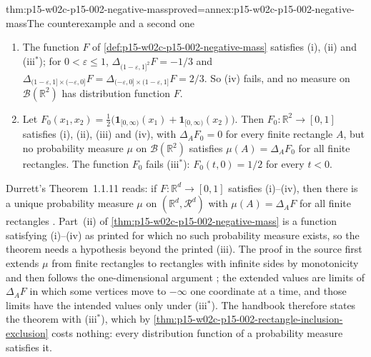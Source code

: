 \begin{hblemma}{thm:p15-w02c-p15-002-negative-mass}{proved=annex:p15-w02c-p15-002-negative-mass}{The counterexample and a second one}
\begin{enumerate}
\item The function \(F\) of \cref{def:p15-w02c-p15-002-negative-mass}
      satisfies (i), (ii) and (iii\(^*\)); for \(0<\varepsilon\leq1\),
      \(\Delta_{(1-\varepsilon,1]^2}F=-1/3\) and
      \(\Delta_{(1-\varepsilon,1]\times(-\varepsilon,0]}F
       =\Delta_{(-\varepsilon,0]\times(1-\varepsilon,1]}F=2/3\). So
      (iv) fails, and no measure on \(\mathcal B(\mathbb R^2)\) has
      distribution function \(F\).
\item Let
      \(F_0(x_1,x_2)=\tfrac12\bigl(\mathbf1_{[0,\infty)}(x_1)
                     +\mathbf1_{[0,\infty)}(x_2)\bigr)\).
      Then \(F_0:\mathbb R^2\to[0,1]\) satisfies (i), (ii), (iii) and
      (iv), with \(\Delta_AF_0=0\) for every finite rectangle \(A\), but no
      probability measure \(\mu\) on \(\mathcal B(\mathbb R^2)\) satisfies
      \(\mu(A)=\Delta_AF_0\) for all finite rectangles. The function
      \(F_0\) fails (iii\(^*\)): \(F_0(t,0)=1/2\) for every \(t<0\).
\end{enumerate}
\end{hblemma}

Durrett's Theorem~1.1.11 reads: if \(F:\mathbb R^d\to[0,1]\) satisfies
(i)--(iv), then there is a unique probability measure \(\mu\) on
\((\mathbb R^d,\mathcal R^d)\) with \(\mu(A)=\Delta_AF\) for all finite
rectangles \cite[Theorem~1.1.11, p.~7]{DurrettPTEAuthor2019}. Part~(ii) of
\cref{thm:p15-w02c-p15-002-negative-mass} is a function satisfying
(i)--(iv) as printed for which no such probability measure exists, so the
theorem needs a hypothesis beyond the printed (iii). The proof in the
source first extends \(\mu\) from finite rectangles to rectangles with
infinite sides by monotonicity and then follows the one-dimensional
argument \cite[pp.~8--9]{DurrettPTEAuthor2019}; the extended values are
limits of \(\Delta_AF\) in which some vertices move to \(-\infty\) one
coordinate at a time, and those limits have the intended values only under
(iii\(^*\)). The handbook therefore states the theorem with (iii\(^*\)),
which by \cref{thm:p15-w02c-p15-002-rectangle-inclusion-exclusion} costs
nothing: every distribution function of a probability measure satisfies
it.

